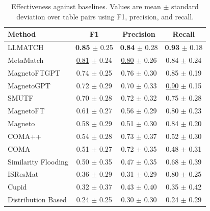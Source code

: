 \documentclass[sigconf, nonacm]{acmart}
\newcommand{\best}[1]{\textbf{#1}}
\newcommand{\second}[1]{\underline{#1}}
\begin{document}
\begin{table}[!t]
\centering
\caption{Effectiveness against baselines. Values are mean $\pm$ standard deviation over table pairs using F1, precision, and recall.}
\label{tab:baselines_effectiveness}
\begin{tabular}{lccc}
\toprule
\textbf{Method} & \textbf{F1} & \textbf{Precision} & \textbf{Recall} \\
\midrule
LLMATCH & \best{0.85} $\pm$ 0.25 & \best{0.84} $\pm$ 0.28 & \best{0.93} $\pm$ 0.18 \\
MetaMatch & \second{0.81} $\pm$ 0.24 & \second{0.80} $\pm$ 0.26 & 0.84 $\pm$ 0.24 \\
MagnetoFTGPT & 0.74 $\pm$ 0.25 & 0.76 $\pm$ 0.30 & 0.85 $\pm$ 0.19 \\
MagnetoGPT & 0.72 $\pm$ 0.29 & 0.70 $\pm$ 0.33 & \second{0.90} $\pm$ 0.15 \\
SMUTF & 0.70 $\pm$ 0.28 & 0.72 $\pm$ 0.32 & 0.75 $\pm$ 0.28 \\
MagnetoFT & 0.61 $\pm$ 0.27 & 0.56 $\pm$ 0.29 & 0.80 $\pm$ 0.23 \\
Magneto & 0.58 $\pm$ 0.29 & 0.51 $\pm$ 0.30 & 0.84 $\pm$ 0.20 \\
COMA++ & 0.54 $\pm$ 0.28 & 0.73 $\pm$ 0.37 & 0.52 $\pm$ 0.30 \\
COMA & 0.51 $\pm$ 0.27 & 0.72 $\pm$ 0.35 & 0.48 $\pm$ 0.31 \\
Similarity Flooding & 0.50 $\pm$ 0.35 & 0.47 $\pm$ 0.35 & 0.68 $\pm$ 0.39 \\
ISResMat & 0.36 $\pm$ 0.29 & 0.31 $\pm$ 0.29 & 0.80 $\pm$ 0.25 \\
Cupid & 0.32 $\pm$ 0.37 & 0.43 $\pm$ 0.40 & 0.35 $\pm$ 0.42 \\
Distribution Based & 0.24 $\pm$ 0.25 & 0.30 $\pm$ 0.30 & 0.24 $\pm$ 0.29 \\
\bottomrule
\end{tabular}
\end{table}
\end{document}
